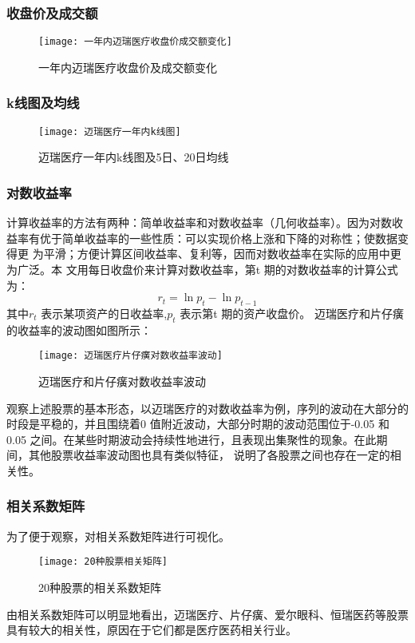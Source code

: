 \documentclass[withoutpreface,bwprint]{cumcmthesis} %
\begin{document}
	\subsubsection{收盘价及成交额}
	 \begin{figure}[H]
		\centering
		\texttt{[image: 一年内迈瑞医疗收盘价成交额变化]}
		\caption{一年内迈瑞医疗收盘价及成交额变化}
		\label{一年内迈瑞医疗收盘价成交额变化}
	\end{figure}
	\subsubsection{k线图及均线}
	 \begin{figure}[H]
		\centering
		\texttt{[image: 迈瑞医疗一年内k线图]}
		\caption{迈瑞医疗一年内k线图及5日、20日均线}
		\label{迈瑞医疗一年内k线图}
	\end{figure}
	\subsubsection{对数收益率}
	计算收益率的方法有两种：简单收益率和对数收益率（几何收益率）。因为对数收
	益率有优于简单收益率的一些性质：可以实现价格上涨和下降的对称性；使数据变得更
	为平滑；方便计算区间收益率、复利等，因而对数收益率在实际的应用中更为广泛。本
	文用每日收盘价来计算对数收益率，第t 期的对数收益率的计算公式为：
	$$
	r_{t}=\ln p_{t}-\ln p_{t-1}
	$$
	其中$r_t$ 表示某项资产的日收益率,$p_t$ 表示第t 期的资产收盘价。
	迈瑞医疗和片仔癀的收益率的波动图如图所示：
 \begin{figure}[H]
	\centering
	\texttt{[image: 迈瑞医疗片仔癀对数收益率波动]}
	\caption{迈瑞医疗和片仔癀对数收益率波动}
	\label{迈瑞医疗片仔癀对数收益率波动}
\end{figure}
观察上述股票的基本形态，以迈瑞医疗的对数收益率为例，序列的波动在大部分的时段是平稳的，并且围绕着0 值附近波动，大部分时期的波动范围位于-0.05 和0.05 之间。在某些时期波动会持续性地进行，且表现出集聚性的现象。在此期间，其他股票收益率波动图也具有类似特征，
说明了各股票之间也存在一定的相关性。
\subsubsection{相关系数矩阵}
	为了便于观察，对相关系数矩阵进行可视化。
\begin{figure}[H]
	\centering
	\texttt{[image: 20种股票相关矩阵]}
	\caption{20种股票的相关系数矩阵}
	\label{相关系数矩阵}
\end{figure}
由相关系数矩阵可以明显地看出，迈瑞医疗、片仔癀、爱尔眼科、恒瑞医药等股票具有较大的相关性，原因在于它们都是医疗医药相关行业。
\end{document}
